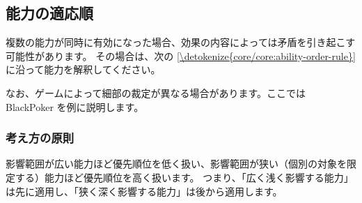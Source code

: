\documentclass[letterpaper,10pt,dvipdfmx]{sphinxmanual}
\begin{document}
\subsection{能力の適応順}
\label{\detokenize{core/core:ability-order}}\label{\detokenize{core/core:id28}}
\sphinxAtStartPar
複数の能力が同時に有効になった場合、効果の内容によっては矛盾を引き起こす可能性があります。
その場合は、次の \hyperref[\detokenize{core/core:ability-order-rule}]{\ref{\detokenize{core/core:ability-order-rule}} } に沿って能力を解釈してください。

\sphinxAtStartPar
なお、ゲームによって細部の裁定が異なる場合があります。ここでは BlackPoker を例に説明します。


\subsubsection{考え方の原則}
\label{\detokenize{core/core:id29}}
\sphinxAtStartPar
影響範囲が広い能力ほど優先順位を低く扱い、影響範囲が狭い（個別の対象を限定する）能力ほど優先順位を高く扱います。
つまり、「広く浅く影響する能力」は先に適用し、「狭く深く影響する能力」は後から適用します。
\end{document}
